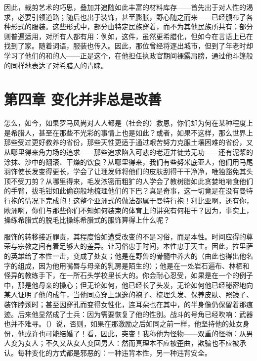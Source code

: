因此，裁剪艺术的巧思，叠加并追随如此丰富的材料库存——首先出于对人性的渴求，必要引领道路；随后也出于装饰，甚至膨胀，野心随之而来——已经颁布了各种形式的服装。这些形式中，部分由特定民族穿着，而不为其他民族所共有；部分则普遍适用，对所有人都有用：例如，这件，虽然更希腊化，但如今在言语上已在找到了家。随着词语，服装也传入。因此，那位曾经将逐出城市，但到了年老时却学习了他们的和的人——正是这个，在他担任执政官期间裸露肩膀，通过他斗篷般的同样地表达了对希腊人的青睐。\par


\section{第四章 变化并非总是改善}

怎么，如今，如果罗马风尚对人人都是（社会的）救恩，你们却为何在某种程度上是希腊人，甚至在那些不光彩的事情上也是如此？或者，如果不这样，那么世界上那些受过更好教养的省份，那些天性更适于通过艰苦努力克服土壤困难的省份，又从哪里得来角力场的追求——那些追求陷入可悲的老迈并徒劳无功——还有泥浆的涂抹、沙中的翻滚、干燥的饮食？从哪里得来，我们有些努米底亚人，他们用马尾羽饰使长发变得更长，学会了让理发师将他们的皮肤刮得干干净净，唯独豁免其头顶不受刀剪？从哪里得来，毛发浓密而粗犷的人学会了教树脂如此贪婪地啃食他们的手臂，拔毛钳如此偷窃般地梳理他们的下巴？真是奇事，这一切竟是在没有曼特行袍的情况下完成的！这整个亚洲式的做法都属于曼特行袍！利比亚啊，还有你，欧洲啊，你们与那些你们不知如何装束的体育上的讲究有何相干？因为，事实上，操练希腊式的脱毛比操练希腊式的服饰算得上什么呢？\par

服饰的转移接近罪责，其程度恰如遭受改变的不是习俗，而是本性。时间应得的尊荣与宗教之间有着足够大的差异。让习俗忠于时间，本性忠于天主。因此，拉里萨的英雄给了本性一击，变成了处女；他是在野兽的骨髓中养大的（由此也得出他名字的组成，因为他用嘴唇与母亲的乳房是陌生的）；他是在一处岩石遍布、林栖和怪异的教练手下，在一所石头学校里长大的。你会耐心忍受，如果是在一个的例子中，那是他母亲的操心；但无论如何，他已经长了头发，无论如何他已经秘密地向某人证明了他的成年，当他同意穿上飘逸的袍子、梳理头发、保养皮肤、照镜子、装饰脖颈时；甚至因穿孔而变得女性化，连耳朵也在其中，的半身像仍保留着那痕迹。后来他显然成了士兵：因为需要恢复了他的性别。战斗的号角已经吹响：武器也并不难寻。（）说，否则，如果在那激励之后如同之前一样，他坚持他的处女身份，他或许也可能结婚了！看，因此，突变！我称他为怪物——双重的怪物：从男人变为女人；不久又从女人变回男人：然而真理本不应被歪曲，欺骗也不应被承认。每种变化的方式都是邪恶的：一种违背本性，另一种违背安全。\par

